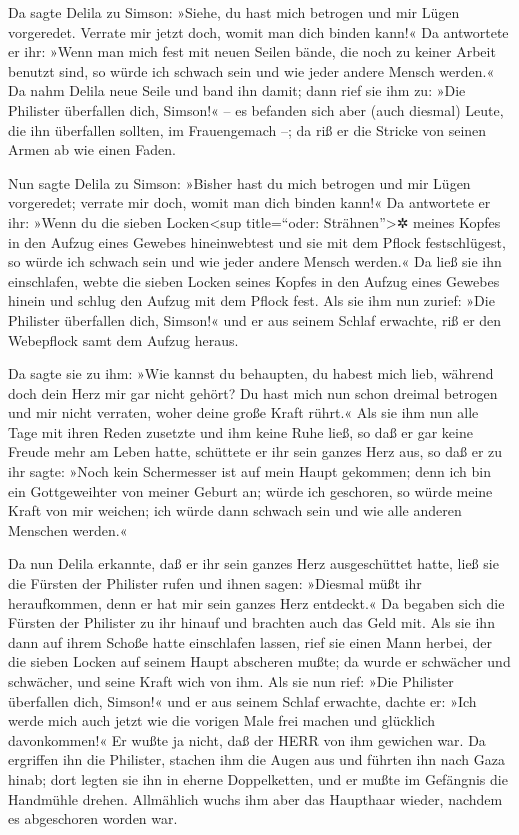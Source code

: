 Da sagte Delila zu Simson: »Siehe, du hast mich betrogen
und mir Lügen vorgeredet. Verrate mir jetzt doch, womit man dich binden
kann!« Da antwortete er ihr: »Wenn man mich fest mit
neuen Seilen bände, die noch zu keiner Arbeit benutzt sind, so würde ich
schwach sein und wie jeder andere Mensch werden.« Da nahm
Delila neue Seile und band ihn damit; dann rief sie ihm zu: »Die
Philister überfallen dich, Simson!« -- es befanden sich aber (auch
diesmal) Leute, die ihn überfallen sollten, im Frauengemach --; da riß
er die Stricke von seinen Armen ab wie einen Faden.

Nun sagte Delila zu Simson: »Bisher hast du mich betrogen
und mir Lügen vorgeredet; verrate mir doch, womit man dich binden kann!«
Da antwortete er ihr: »Wenn du die sieben Locken\textless sup
title=``oder: Strähnen''\textgreater✲ meines Kopfes in den Aufzug eines
Gewebes hineinwebtest und sie mit dem Pflock festschlügest, so würde ich
schwach sein und wie jeder andere Mensch werden.« Da ließ sie ihn
einschlafen, webte die sieben Locken seines Kopfes in den Aufzug eines
Gewebes hinein und schlug den Aufzug mit dem Pflock fest.
Als sie ihm nun zurief: »Die Philister überfallen dich, Simson!« und er
aus seinem Schlaf erwachte, riß er den Webepflock samt dem Aufzug
heraus.

Da sagte sie zu ihm: »Wie kannst du behaupten, du habest
mich lieb, während doch dein Herz mir gar nicht gehört? Du hast mich nun
schon dreimal betrogen und mir nicht verraten, woher deine große Kraft
rührt.« Als sie ihm nun alle Tage mit ihren Reden
zusetzte und ihm keine Ruhe ließ, so daß er gar keine Freude mehr am
Leben hatte, schüttete er ihr sein ganzes Herz aus, so
daß er zu ihr sagte: »Noch kein Schermesser ist auf mein Haupt gekommen;
denn ich bin ein Gottgeweihter von meiner Geburt an; würde ich
geschoren, so würde meine Kraft von mir weichen; ich würde dann schwach
sein und wie alle anderen Menschen werden.«

Da nun Delila erkannte, daß er ihr sein ganzes Herz
ausgeschüttet hatte, ließ sie die Fürsten der Philister rufen und ihnen
sagen: »Diesmal müßt ihr heraufkommen, denn er hat mir sein ganzes Herz
entdeckt.« Da begaben sich die Fürsten der Philister zu ihr hinauf und
brachten auch das Geld mit. Als sie ihn dann auf ihrem
Schoße hatte einschlafen lassen, rief sie einen Mann herbei, der die
sieben Locken auf seinem Haupt abscheren mußte; da wurde er schwächer
und schwächer, und seine Kraft wich von ihm. Als sie nun
rief: »Die Philister überfallen dich, Simson!« und er aus seinem Schlaf
erwachte, dachte er: »Ich werde mich auch jetzt wie die vorigen Male
frei machen und glücklich davonkommen!« Er wußte ja nicht, daß der HERR
von ihm gewichen war. Da ergriffen ihn die Philister,
stachen ihm die Augen aus und führten ihn nach Gaza hinab; dort legten
sie ihn in eherne Doppelketten, und er mußte im Gefängnis die Handmühle
drehen. Allmählich wuchs ihm aber das Haupthaar wieder,
nachdem es abgeschoren worden war.

